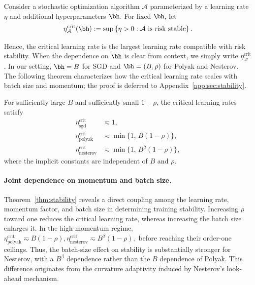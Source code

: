 \documentclass[11pt]{article}
\newcommand{\sgd}{\mathrm{sgd}}
\newcommand{\polyak}{\mathrm{polyak}}
\newcommand{\nesterov}{\mathrm{nesterov}}
\newcommand{\crit}{\mathrm{crit}}
\begin{document}
\begin{definition}
Consider a stochastic optimization algorithm $\mathcal A$ parameterized by a learning rate $\eta$ and additional hyperparameters $\bh$. For fixed $\bh$,  let
\[
\eta_{\mathcal A}^{\crit}(\bh):=\sup\left\{\eta>0:\mathcal A\text{ is risk stable}\right\}.
\]
\end{definition}
Hence, the critical learning rate is the largest learning rate compatible with risk stability. When the dependence on $\bh$ is clear from context, we simply write $\eta_{\mathcal A}^{\crit}$. In our setting, $\bh=B$ for SGD and $\bh=(B,\rho)$ for Polyak and Nesterov. The following theorem characterizes how the critical learning rate scales with batch size and momentum; the proof is deferred to Appendix~\ref{app:sec:stability}.
\begin{highlightedtheorem}
\begin{theorem}\label{thm:stability}
\normalfont
For sufficiently large \(B\) and sufficiently small \(1-\rho\), the critical learning rates satisfy
\begin{align}
\eta_{\sgd}^{\crit} &\eqsim 1,\\
\eta_{\polyak}^{\crit} &\eqsim \min\{1,\,B(1-\rho)\},\\
\eta_{\nesterov}^{\crit} &\eqsim \min\{1,\,B^\beta(1-\rho)\},
\end{align}
where the implicit constants are independent of \(B\) and \(\rho\).
\end{theorem}
\end{highlightedtheorem}



\paragraph{Joint dependence on momentum and batch size.}
Theorem~\ref{thm:stability} reveals a direct coupling among the learning
rate, momentum factor, and batch size in determining training stability.
Increasing $\rho$ toward one reduces the critical learning rate, whereas
increasing the batch size enlarges it. In the high-momentum regime,
$
\eta_{\polyak}^{\crit}\eqsim B(1-\rho),
\eta_{\nesterov}^{\crit}\eqsim B^\beta(1-\rho),
$
before reaching their order-one ceilings. Thus, the batch-size effect on
stability is substantially stronger for Nesterov, with a $B^\beta$
dependence rather than the $B$ dependence of Polyak. This difference originates from the curvature adaptivity induced by Nesterov's look-ahead mechanism.
\end{document}
